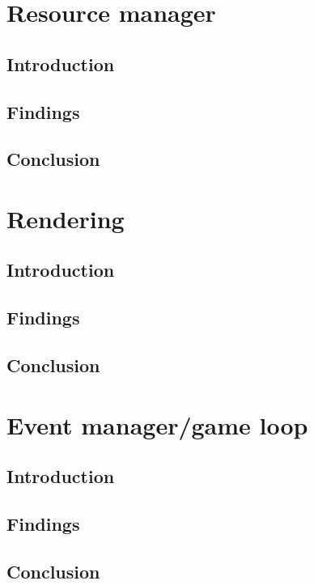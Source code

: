 \documentclass{projdoc}
\begin{document}
\section{Resource manager}

\subsection{Introduction}

\subsection{Findings}

\subsection{Conclusion}

\section{Rendering}

\subsection{Introduction}

\subsection{Findings}

\subsection{Conclusion}

\section{Event manager/game loop}

\subsection{Introduction}

\subsection{Findings}

\subsection{Conclusion}
\end{document}
